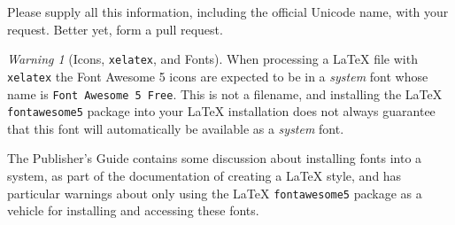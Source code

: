 \documentclass{amsart}
\theoremstyle{plain}%
\theoremstyle{definition}%
\theoremstyle{remark}%
\newtheorem{warning}[theorem]{Warning}
\newcommand{\mono}[1]{\texttt{#1}}
\numberwithin{equation}{section}
\begin{document}
Please supply all this information, including the official Unicode name, with your request.  Better yet, form a pull request.%
\begin{warning}[Icons, \mono{xelatex}, and Fonts]\label{subsection-icons-in-text-7}%
%
When processing a \LaTeX{} file with \mono{xelatex} the Font Awesome 5 icons are expected to be in a \emph{system} font whose name is \mono{Font Awesome 5 Free}.  This is not a filename, and installing the \LaTeX{} \mono{fontawesome5} package into your \LaTeX{} installation does not always guarantee that this font will automatically be available as a \emph{system} font.%
\par
The Publisher's Guide contains some discussion about installing fonts into a system, as part of the documentation of creating a \LaTeX{} style, and has particular warnings about only using the \LaTeX{} \mono{fontawesome5} package as a vehicle for installing and accessing these fonts.%
\end{warning}
%
%
\typeout{************************************************}
\typeout{************************************************}
%
\end{document}
